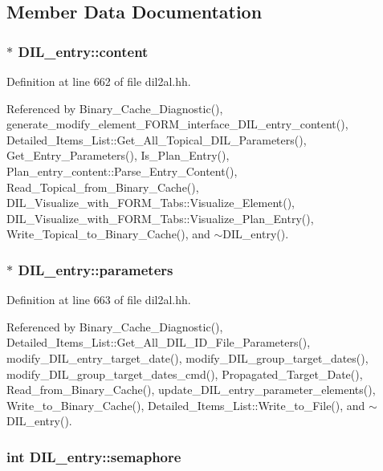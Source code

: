\subsection{Member Data Documentation}
\subsubsection{$\ast$ DIL\_\-entry::content}\label{classDIL__entry_m0}




Definition at line 662 of file dil2al.hh.

Referenced by Binary\_\-Cache\_\-Diagnostic(), generate\_\-modify\_\-element\_\-FORM\_\-interface\_\-DIL\_\-entry\_\-content(), Detailed\_\-Items\_\-List::Get\_\-All\_\-Topical\_\-DIL\_\-Parameters(), Get\_\-Entry\_\-Parameters(), Is\_\-Plan\_\-Entry(), Plan\_\-entry\_\-content::Parse\_\-Entry\_\-Content(), Read\_\-Topical\_\-from\_\-Binary\_\-Cache(), DIL\_\-Visualize\_\-with\_\-FORM\_\-Tabs::Visualize\_\-Element(), DIL\_\-Visualize\_\-with\_\-FORM\_\-Tabs::Visualize\_\-Plan\_\-Entry(), Write\_\-Topical\_\-to\_\-Binary\_\-Cache(), and $\sim$DIL\_\-entry().
\subsubsection{$\ast$ DIL\_\-entry::parameters}\label{classDIL__entry_m1}




Definition at line 663 of file dil2al.hh.

Referenced by Binary\_\-Cache\_\-Diagnostic(), Detailed\_\-Items\_\-List::Get\_\-All\_\-DIL\_\-ID\_\-File\_\-Parameters(), modify\_\-DIL\_\-entry\_\-target\_\-date(), modify\_\-DIL\_\-group\_\-target\_\-dates(), modify\_\-DIL\_\-group\_\-target\_\-dates\_\-cmd(), Propagated\_\-Target\_\-Date(), Read\_\-from\_\-Binary\_\-Cache(), update\_\-DIL\_\-entry\_\-parameter\_\-elements(), Write\_\-to\_\-Binary\_\-Cache(), Detailed\_\-Items\_\-List::Write\_\-to\_\-File(), and $\sim$DIL\_\-entry().
\subsubsection{\setlength{\rightskip}{0pt plus 5cm}int DIL\_\-entry::semaphore\hspace{0.3cm}{\tt  [protected]}}\label{classDIL__entry_n0}




